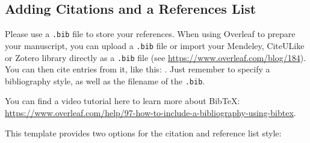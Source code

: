 \documentclass[alpha-refs,serif]{ecotropicos-article}
\begin{document}
\begin{multicols}{2}
\subsection*{Adding Citations and a References List}

Please use a \verb|.bib| file to store your references. When using Overleaf to prepare your manuscript, you can upload a \verb|.bib| file or import your Mendeley, CiteULike or Zotero library directly as a \verb|.bib| file (see \url{https://www.overleaf.com/blog/184}). You can then cite entries from it, like this: \cite{lees2010theoretical}. Just remember to specify a bibliography style, as well as the filename of the \verb|.bib|.

You can find a video tutorial here to learn more about BibTeX: \url{https://www.overleaf.com/help/97-how-to-include-a-bibliography-using-bibtex}.

This template provides two options for the citation and reference list style: 
\end{multicols}
\end{document}
